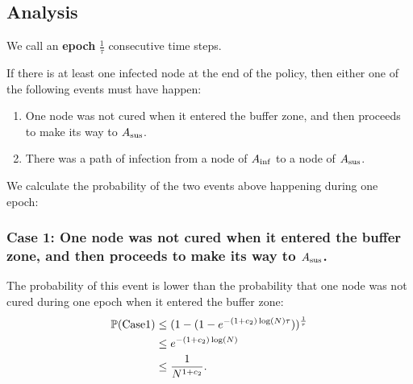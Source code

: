 \subsection{Analysis}
\begin{definition}
	We call an \textbf{epoch} $\frac{1}{\tau}$ consecutive time steps.
\end{definition}

If there is at least one infected node at the end of the policy, then either one of the following events must have happen:
\begin{enumerate}
	\item One node was not cured when it entered the buffer zone, and then proceeds to make its way to $A_{{\rm sus}}$.
	\item There was a path of infection from a node of $A_{{\rm inf}}$ to a node of $A_{{\rm sus}}$.
\end{enumerate}
We calculate the probability of the two events above happening during one epoch:

\subsubsection{Case 1: One node was not cured when it entered the buffer zone, and then proceeds to make its way to $A_{{\rm sus}}$.}
The probability of this event is lower than the probability that one node was not cured during one epoch when it entered the buffer zone:
\begin{align*}
\mathbb{P}(\rm{Case 1}) &\leq (1 - (1- e^{-(1+c_2)\log(N) \tau}))^{\frac{1}{\tau}} \\
&\leq e^{-(1+c_2)\log(N)} \\
&\leq \frac{1}{N^{1+c_2}}.
\end{align*}

